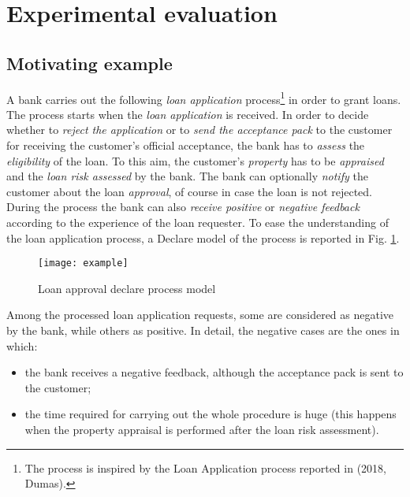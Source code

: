 
\section{Experimental evaluation}
\label{sec:eval}



\subsection{Motivating example}
A bank carries out the following \emph{loan application} process\footnote{The process is inspired by the Loan Application process reported in (2018, Dumas).} in order to grant loans. The process starts when the \emph{loan application} is received. In order to decide whether to \emph{reject the application} or to \emph{send the acceptance pack} to the customer for receiving the customer's official acceptance, the bank has to \emph{assess} the \emph{eligibility} of the loan. To this aim, the customer's \emph{property} has to be \emph{appraised} and the \emph{loan risk assessed} by the bank. The bank can optionally \emph{notify} the customer about the loan \emph{approval}, of course in case the loan is not rejected. During the process the bank can also \emph{receive positive} or \emph{negative feedback} according to the experience of the loan requester. To ease the understanding of the loan application process, a Declare model of the process is reported in Fig. \ref{fig:ex}.


\begin{figure}[t]
\centering
\texttt{[image: example]}
\caption{Loan approval declare process model }
\label{fig:ex}
\end{figure}

Among the processed loan application requests, some are considered as negative by the bank, while others as positive. In detail, the negative cases are the ones in which:
\begin{itemize}
\item the bank receives a negative feedback, although the acceptance pack is sent to the customer;
\item the time required for carrying out the whole procedure is huge (this happens when the property appraisal is performed after the loan risk assessment).
\end{itemize}

